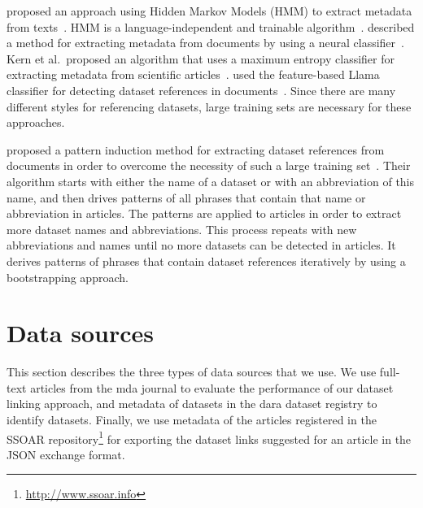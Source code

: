 \documentclass{IOS-Book-Article}
\newcommand{\dara}{\textsf{da\textbar ra}}
\begin{document}
\citeauthor{Cui2010} proposed an approach using Hidden Markov Models (HMM) to extract metadata from texts~\citeyearpar{Cui2010}. 
HMM is a language-independent and trainable algorithm~\cite{Kubala1998}.
\citeauthor{Marinai2009} described a method for extracting metadata from documents by using a neural classifier~\citeyearpar{Marinai2009}.
Kern et al.\ proposed an algorithm that uses a maximum entropy classifier for extracting metadata from scientific articles~\cite{Kern2012}.
\citeauthor{MeiyuLu2012} used the feature-based Llama classifier for detecting dataset references in documents~\citeyearpar{MeiyuLu2012}.
Since there are many different styles for referencing datasets, large training sets are necessary for these approaches.

\citeauthor{Boland2012} proposed a pattern induction method for extracting dataset references from documents in order to overcome the necessity of such a large training set~\citeyearpar{Boland2012}.
Their algorithm starts with either the name of a dataset or with an abbreviation of this name, and then drives patterns of all phrases that contain that name or abbreviation in articles.
The patterns are applied to articles in order to extract more dataset names and abbreviations.
This process repeats with new abbreviations and names until no more datasets can be detected in articles.
It derives patterns of phrases that contain dataset references iteratively by using a bootstrapping approach.

\section{Data sources}
\label{sec:data}
This section describes the three types of data sources that we use. We use full-text articles from the mda journal to evaluate the performance of our dataset linking approach, and metadata of datasets in the {\dara} dataset registry to identify datasets. 
Finally, we use metadata of the articles registered in the SSOAR repository\footnote{\url{http://www.ssoar.info}} for exporting the dataset links suggested for an article in the JSON exchange format.
 
\end{document}
